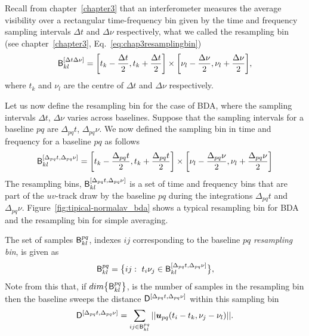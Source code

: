 \documentclass[useAMS,usenatbib]{mn2e}
\begin{document}
Recall from chapter~\ref{chapter3} that an interferometer measures the average visibility over a rectangular time-frequency bin given by the 
time and frequency sampling intervals $\Delta t$ and $\Delta \nu$ respectively, what we called the resampling bin 
(see chapter~\ref{chapter3}, Eq.~\ref{eq:chap3resamplingbin})
\begin{equation}
\mathsf{B}^{[\Delta t\Delta\nu]}_{kl} = \bigg [ t_k-\frac{\Delta t}{2},t_k+\frac{\Delta t}{2} \bigg ]
\times
\bigg [ \nu_l-\frac{\Delta\nu}{2},\nu_l+\frac{\Delta\nu}{2} \bigg ],  
\end{equation}
 where $t_k$ and $\nu_l$ are the centre of $\Delta t$ and $\Delta \nu$ respectively.
 
%  
Let us now define the resampling bin for the case of BDA, where the sampling intervals
 $\Delta t$, $\Delta \nu$ varies across baselines.
 Suppose that the  sampling intervals for a baseline $pq$ are  $\Delta_{pq} t$, $\Delta_{pq} \nu$. We now defined 
 the sampling bin in time and frequency for a baseline $pq$ as follows
 \begin{equation}
\mathsf{B}^{[\Delta_{pq} t, \Delta_{pq} \nu]}_{kl} = \bigg [ t_k-\frac{\Delta_{pq} t}{2},t_k+\frac{\Delta_{pq} t}{2} \bigg ]
\times
\bigg [ \nu_l-\frac{\Delta_{pq}\nu}{2},\nu_l+\frac{\Delta_{pq}\nu}{2} \bigg ]
\end{equation}
 The resampling bins, 
 $\mathsf{B}^{[\Delta_{pq} t, \Delta_{pq} \nu]}_{kl}$ is a set of time and frequency bins that  are part of the $uv$-track
 draw by  the baseline $pq$ during the integrations $\Delta_{pq} t$ and $\Delta_{pq}\nu$.
Figure~\ref{fig:tipical-normalav_bda} shows a typical resampling bin for BDA  and the 
resampling bin for simple averaging.

The set of samples $\mathsf{B}_{kl}^{pq}$, indexes $ij$ corresponding to the baseline $pq$ \emph{resampling bin}, is given as
\begin{equation}
\mathsf{B}_{kl}^{pq} = \big \{ ij:~t_i\nu_j \in \mathsf{B}^{[\Delta_{pq} t, \Delta_{pq} \nu]}_{kl} \big \},
\end{equation}
Note from this that, if $dim\big\{\mathsf{B}_{kl}^{pq}\big\}$, is the number of samples in the resampling bin  then the
baseline sweeps the  distance $\mathsf{D}^{[\Delta_{pq} t, \Delta_{pq} \nu]}$ within this sampling bin
\begin{equation}
\Dbda= \sum_{ij \in \Bij_{kl}^{pq}}||\bmath{u}_{pq}(t_i-t_k, \nu_j-\nu_l)||.
\end{equation}
\end{document}
